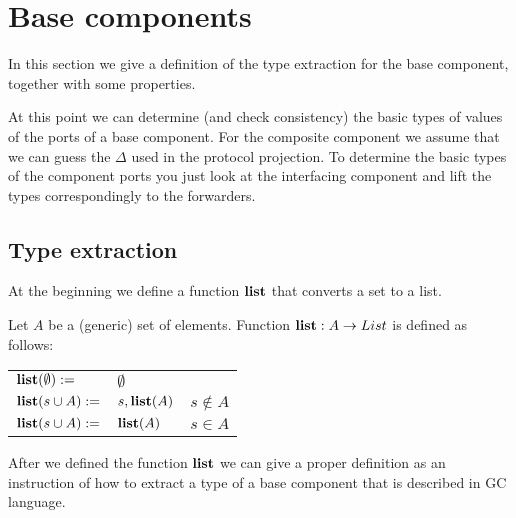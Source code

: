 
  \section{ Base components}

In this section we give a definition of the type extraction for the base component, together with some properties. 

At this point we can determine (and check consistency) the basic types of values of the ports of a base component. For the composite component we assume that we can guess the $\Delta$ used in the protocol projection. To determine the basic types of the component ports you just look at the interfacing component and lift the types correspondingly to the forwarders.

\subsection{Type extraction}
\vspace{0.5cm}

At the beginning we define a function $\textbf{list}$ that converts a set to a list.

\begin{definition}

Let $A$ be a (generic) set of elements. Function $\textbf{list}:A\rightarrow List$ is defined as follows:\\

\begin{tabular}{l l l}

$\textbf{list}(\emptyset):=$ & $\emptyset $ & \\
$\textbf{list}({s}\cup A):=$ & $s,\textbf{list}(A)$ & $s\notin A$\\

$\textbf{list}({s}\cup A):=$ & $\textbf{list}(A)$ & $s\in A$ 




\end{tabular}

\end{definition}
\vspace{0.5cm}


After we defined the function $\textbf{list}$ we can give a proper definition as an instruction of how to extract a type of a base component that is described in GC language.


